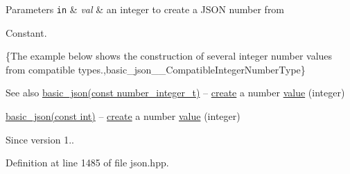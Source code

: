 \begin{DoxyParams}[1]{Parameters}
\mbox{\tt in}  & {\em val} & an integer to create a J\+S\+O\+N number from\\
\hline
\end{DoxyParams}
Constant.

\{The example below shows the construction of several integer number values from compatible types.,basic\+\_\+json\+\_\+\+\_\+\+Compatible\+Integer\+Number\+Type\}

\begin{DoxySeeAlso}{See also}
\hyperlink{classnlohmann_1_1basic__json_a0d838bc7ffca6017f51167e0a8ffd9b6}{basic\+\_\+json(const number\+\_\+integer\+\_\+t)} -- \hyperlink{classnlohmann_1_1basic__json_a27df4303fbc83071275074486b54a40e}{create} a number \hyperlink{classnlohmann_1_1basic__json_a0a2cbbd95862a623e7dc5c37e67dead0}{value} (integer) 

\hyperlink{classnlohmann_1_1basic__json_a70ae1f0747f5b7a89979512866474f1a}{basic\+\_\+json(const int)} -- \hyperlink{classnlohmann_1_1basic__json_a27df4303fbc83071275074486b54a40e}{create} a number \hyperlink{classnlohmann_1_1basic__json_a0a2cbbd95862a623e7dc5c37e67dead0}{value} (integer)
\end{DoxySeeAlso}
\begin{DoxySince}{Since}
version 1.. 
\end{DoxySince}


Definition at line 1485 of file json.\+hpp.

\hypertarget{classnlohmann_1_1basic__json_a85b09b03916d3d1e73373f49cdd4136d}{}
